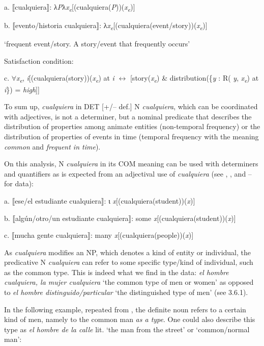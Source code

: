   a.  ⟦cualquiera⟧: λ\textit{P}λ\textit{x\textsubscript{e}}[(cualquiera(\textit{P}))(\textit{x\textsubscript{e}})]

  b.  ⟦evento/historia cualquiera⟧: λ\textit{x\textsubscript{e}}[(cualquiera(event/story))(\textit{x\textsubscript{e}})]

    ‘frequent event/story. A story/event that frequently occurs’

  Satisfaction condition:

  c.  ${\forall}$\textit{x\textsubscript{e}}, \textit{i}[(cualquiera(story))(\textit{x\textsubscript{e}}) at \textit{i} $\leftrightarrow $ [story(\textit{x\textsubscript{e}}) \& distribution(\{\textit{y} : R( \textit{y}, \textit{x\textsubscript{e}}) at \textit{i}\}) = \textit{high}]]

To sum up, \textit{cualquiera} in DET [+/– def.] N \textit{cualquiera}, which can be coordinated with adjectives, is not a determiner, but a nominal predicate that describes the distribution of properties among animate entities (non-temporal frequency) or the distribution of properties of events in time (temporal frequency with the meaning \textit{common} and \textit{frequent in time}).

On this analysis, N \textit{cualquiera} in its COM meaning can be used with determiners and quantifiers as is expected from an adjectival use of \textit{cualquiera} (see , , and –  for data):

  a.  ⟦ese/el estudiante cualquiera⟧: ι \textit{x}[(cualquiera(student))(\textit{x})]

  b.  ⟦algún/otro/un estudiante cualquiera⟧: some \textit{x}[(cualquiera(student))(\textit{x})]

  c.  ⟦mucha gente cualquiera⟧: many \textit{x}[(cualquiera(people))(\textit{x})]

As \textit{cualquiera} modifies an NP, which denotes a kind of entity or individual, the predicative N \textit{cualquiera} can refer to some specific type/kind of individual, such as the common type. This is indeed what we find in the data: \textit{el hombre cualquiera, la mujer cualquiera} ‘the common type of men or women’ as opposed to \textit{el hombre distinguido/particular} ‘the distinguished type of men’ (see 3.6.1).

  In the following example, repeated from , the definite noun refers to a certain kind of men, namely to the common man \textit{as a type}. One could also describe this type as \textit{el hombre de la calle} lit. ‘the man from the street’ or ‘common/normal man’:

